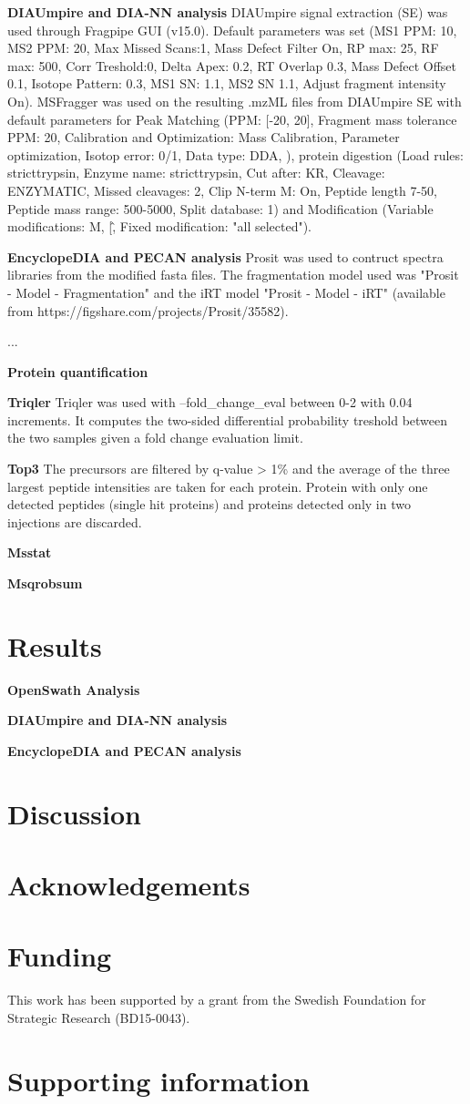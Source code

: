 \documentclass[10pt,letterpaper]{article}
\begin{document}
\textbf{DIAUmpire and DIA-NN analysis}
DIAUmpire signal extraction (SE) was used through Fragpipe GUI (v15.0). Default parameters was set (MS1 PPM: 10, MS2 PPM: 20, Max Missed Scans:1, Mass Defect Filter On, RP max: 25, RF max: 500, Corr Treshold:0, Delta Apex: 0.2, RT Overlap 0.3, Mass Defect Offset 0.1, Isotope Pattern: 0.3, MS1 SN: 1.1, MS2 SN 1.1, Adjust fragment intensity On). MSFragger was used on the resulting .mzML files from DIAUmpire SE with default parameters for Peak Matching (PPM: [-20, 20], Fragment mass tolerance PPM: 20, Calibration and Optimization: Mass Calibration, Parameter optimization, Isotop error: 0/1, Data type: DDA, ), protein digestion (Load rules: stricttrypsin, Enzyme name: stricttrypsin, Cut after: KR, Cleavage: ENZYMATIC, Missed cleavages: 2, Clip N-term M: On, Peptide length 7-50, Peptide mass range: 500-5000, Split database: 1) and Modification (Variable modifications: M, \/[\^, Fixed modification: "all selected"). 

\textbf{EncyclopeDIA and PECAN analysis}
Prosit was used to contruct spectra libraries from the modified fasta files. The fragmentation model used was "Prosit - Model - Fragmentation" and the iRT model "Prosit - Model - iRT" (available from https://figshare.com/projects/Prosit/35582).

...


\textbf{Protein quantification}


\textbf{Triqler}
Triqler was used with --fold\_change\_eval between 0-2 with 0.04 increments. It computes the two-sided differential probability treshold between the two samples given a fold change evaluation limit. 

\textbf{Top3}
The precursors are filtered by q-value > 1\% and the average of the three largest peptide intensities are taken for each protein. Protein with only one detected peptides (single hit proteins) and proteins detected only in two injections are discarded.


\textbf{Msstat}

\textbf{Msqrobsum}



\section*{Results}
\textbf{OpenSwath Analysis}

\textbf{DIAUmpire and DIA-NN analysis}

\textbf{EncyclopeDIA and PECAN analysis}


\section*{Discussion}

\section*{Acknowledgements}


\section*{Funding}

This work has been supported by a grant from the Swedish Foundation for Strategic Research (BD15-0043).

\section*{Supporting information}



\end{document}
